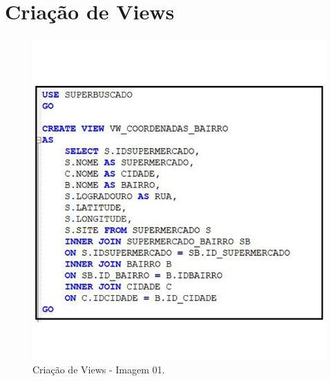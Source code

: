 			
\section{Criação de Views}
\begin{figure}[H]
    \centering
    \caption{Criação de Views - Imagem 01.}
    \includegraphics[scale=0.8]{Imagens/CriacaoDeViews01.png}
\end{figure}

